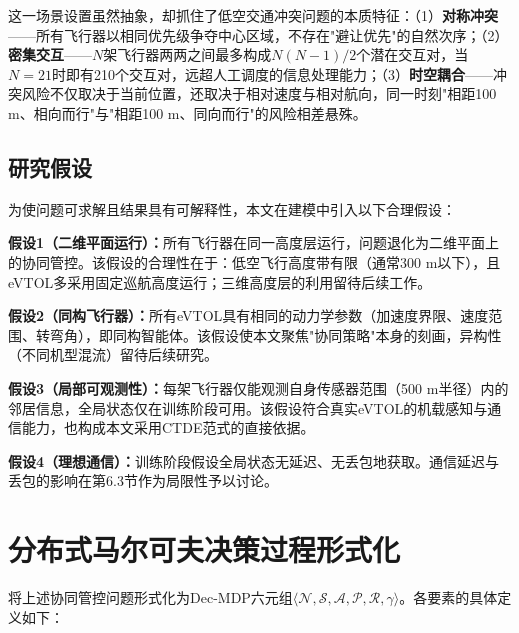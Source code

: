 \documentclass[12pt,a4paper,UTF8]{ctexbook}
\begin{document}
这一场景设置虽然抽象，却抓住了低空交通冲突问题的本质特征：（1）\textbf{对称冲突}——所有飞行器以相同优先级争夺中心区域，不存在"避让优先"的自然次序；（2）\textbf{密集交互}——$N$架飞行器两两之间最多构成$N(N-1)/2$个潜在交互对，当$N=21$时即有210个交互对，远超人工调度的信息处理能力；（3）\textbf{时空耦合}——冲突风险不仅取决于当前位置，还取决于相对速度与相对航向，同一时刻"相距100 m、相向而行"与"相距100 m、同向而行"的风险相差悬殊。

\subsection{研究假设}

为使问题可求解且结果具有可解释性，本文在建模中引入以下合理假设：

\textbf{假设1（二维平面运行）：}所有飞行器在同一高度层运行，问题退化为二维平面上的协同管控。该假设的合理性在于：低空飞行高度带有限（通常300 m以下），且eVTOL多采用固定巡航高度运行；三维高度层的利用留待后续工作。

\textbf{假设2（同构飞行器）：}所有eVTOL具有相同的动力学参数（加速度界限、速度范围、转弯角），即同构智能体。该假设使本文聚焦"协同策略"本身的刻画，异构性（不同机型混流）留待后续研究。

\textbf{假设3（局部可观测性）：}每架飞行器仅能观测自身传感器范围（500 m半径）内的邻居信息，全局状态仅在训练阶段可用。该假设符合真实eVTOL的机载感知与通信能力，也构成本文采用CTDE范式的直接依据。

\textbf{假设4（理想通信）：}训练阶段假设全局状态无延迟、无丢包地获取。通信延迟与丢包的影响在第6.3节作为局限性予以讨论。

\section{分布式马尔可夫决策过程形式化}

将上述协同管控问题形式化为Dec-MDP六元组$\langle \mathcal{N}, \mathcal{S}, \mathcal{A}, \mathcal{P}, \mathcal{R}, \gamma \rangle$。各要素的具体定义如下：
\end{document}

